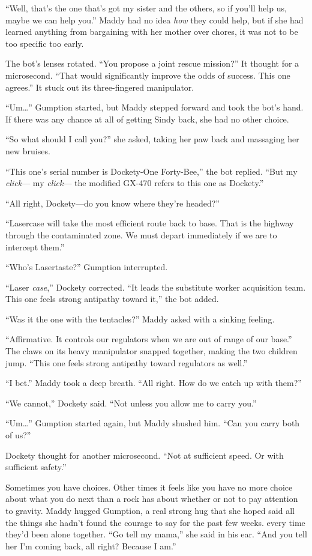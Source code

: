 \documentclass[10pt]{article}
\begin{document}
``Well, that's the one that's got my sister and the others, so if you'll
help us, maybe we can help you.'' Maddy had no idea \emph{how} they
could help, but if she had learned anything from bargaining with her
mother over chores, it was not to be too specific too early.

The bot's lenses rotated. ``You propose a joint rescue mission?'' It
thought for a microsecond. ``That would significantly improve the odds
of success. This one agrees.'' It stuck out its three-fingered
manipulator.

``Um\ldots{}'' Gumption started, but Maddy stepped forward and took the
bot's hand. If there was any chance at all of getting Sindy back, she
had no other choice.

``So what should I call you?'' she asked, taking her paw back and
massaging her new bruises.

``This one's serial number is Dockety-One Forty-Bee,'' the bot replied.
``But my \emph{click}--- my \emph{click}--- the modified GX-470 refers
to this one as Dockety.''

``All right, Dockety---do you know where they're headed?''

``Lasercase will take the most efficient route back to base. That is the
highway through the contaminated zone. We must depart immediately if we
are to intercept them.''

``Who's Lasertaste?'' Gumption interrupted.

``Laser \emph{case},'' Dockety corrected. ``It leads the substitute
worker acquisition team. This one feels strong antipathy toward it,''
the bot added.

``Was it the one with the tentacles?'' Maddy asked with a sinking
feeling.

``Affirmative. It controls our regulators when we are out of range of
our base.'' The claws on its heavy manipulator snapped together, making
the two children jump. ``This one feels strong antipathy toward
regulators as well.''

``I bet.'' Maddy took a deep breath. ``All right. How do we catch up
with them?''

``We cannot,'' Dockety said. ``Not unless you allow me to carry you.''

``Um\ldots{}'' Gumption started again, but Maddy shushed him. ``Can you
carry both of us?''

Dockety thought for another microsecond. ``Not at sufficient speed. Or
with sufficient safety.''

Sometimes you have choices. Other times it feels like you have no more
choice about what you do next than a rock has about whether or not to
pay attention to gravity. Maddy hugged Gumption, a real strong hug that
she hoped said all the things she hadn't found the courage to say for
the past few weeks. every time they'd been alone together. ``Go tell my
mama,'' she said in his ear. ``And you tell her I'm coming back, all
right? Because I am.''
\end{document}
